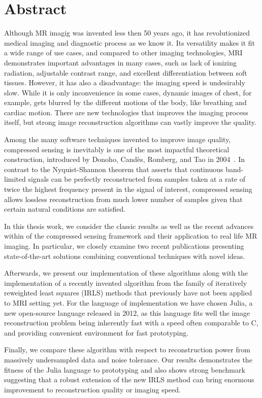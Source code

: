 \chapter*{Abstract}

Although MR imagig was invented less then 50 years ago, it has revolutionized medical imaging and diagnostic process as we know it. Its versatility makes it fit a wide range of use cases, and compared to other imaging technologies, MRI demonstrates important advantages in many cases, such as lack of ionizing radiation, adjustable contrast range, and excellent differentiation between soft tissues. However, it has also a disadvantage: the imaging speed is undesirably slow. While it is only inconvenience in some cases, dynamic images of chest, for example, gets blurred by the different motions of the body, like breathing and cardiac motion. There are new technologies that improves the imaging process itself, but strong image reconstruction algorithms can vastly improve the quality.

Among the many software techniques invented to improve image quality, compressed sensing is inevitably is one of the most impactful theoretical construction, introduced by Donoho, Candès, Romberg, and Tao in 2004~\cite{candes_robust_2006, donoho_compressed_2006, candes_nearoptimal_2006}. In contrast to the Nyquist-Shannon theorem that asserts that continuous band-limited signals can be perfectly reconstructed from samples taken at a rate of twice the highest frequency present in the signal of interest, compressed sensing allows lossless reconstruction from much lower number of samples given that certain natural conditions are satisfied.

In this thesis work, we consider the classic results as well as the recent advances within of the compressed sensing framework and their application to real life MR imaging. In particular, we closely examine two recent publications presenting state-of-the-art solutions combining conventional techniques with novel ideas.

Afterwards, we present our implementation of these algorithms along with the implementation of a recently invented algorithm from the family of iteratively reweighted least squares (IRLS) methods that previously have not been applied to MRI setting yet. For the language of implementation we have chosen Julia, a new open-source language released in 2012, as this language fits well the image reconstruction problem being inherently fast with a speed often comparable to C, and providing convenient environment for fast prototyping.

Finally, we compare these algorithm with respect to reconstruction power from massively undersampled data and noise tolerance. Our results demonstrates the fitness of the Julia language to prototyping and also shows strong benchmark suggesting that a robust extension of the new IRLS method can bring enormous improvement to reconstruction quality or imaging speed.

\clearpage